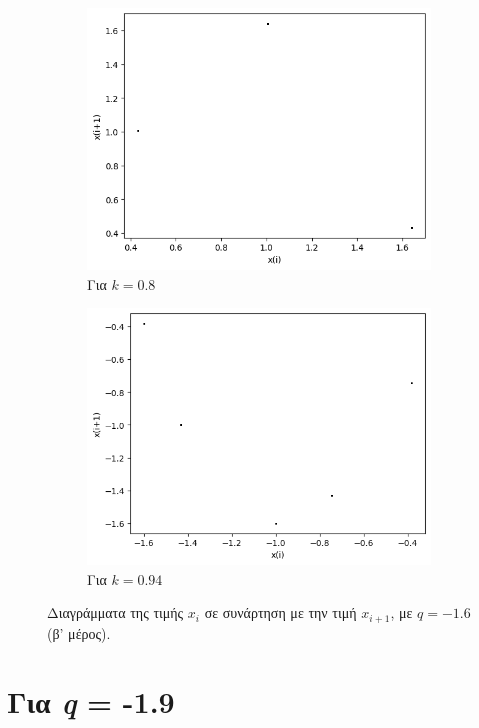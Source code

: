 \begin{figure}[ht]
\begin{subfigure}[b]{0.4\textwidth}
		\includegraphics[width=\textwidth]{LateX images/graphs q16/g19}
		\caption{Για $k=0.8$}
		\label{f:k90}
	\end{subfigure}
	\hfill
	\begin{subfigure}[b]{0.4\textwidth}
		\centering
		\includegraphics[width=\textwidth]{LateX images/graphs q16/g20}
		\caption{Για $k=0.94$}
		\label{f:k91}
	\end{subfigure}
	\hfill
	\caption{Διαγράμματα της τιμής \(x_i\) σε συνάρτηση με την τιμή \(x_{i+1}\), με $q=-1.6$ (β' μέρος).}
	\label{f:k241}
\end{figure}


\clearpage
\newpage

\section{Για \emph{q} = -1.9}

